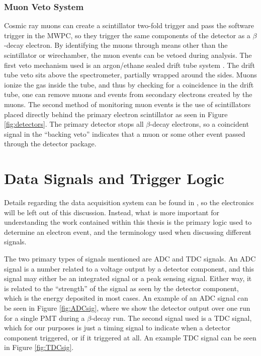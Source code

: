 \subsubsection{Muon Veto System}

Cosmic ray muons can create a scintillator two-fold trigger and pass the software trigger in
the MWPC, so they trigger the same components of the detector as a $\beta$-decay electron. By identifying
the muons through means other than the scintillator or wirechamber, the muon events
can be vetoed during analysis. The first veto mechanism used
is an argon/ethane sealed drift tube system \cite{rios2011sealed}. The drift tube veto sits
above the spectrometer, partially wrapped around the sides. Muons ionize the gas inside the
tube, and thus by checking for a coincidence in the drift tube, one can remove muons
and events from secondary electrons created by the muons. The second method of monitoring
muon events is the use of scintillators placed directly behind the primary
electron scintillator as seen in Figure \ref{fig:detectors}. The primary detector
stops all $\beta$-decay electrons, so a coincident signal in the ``backing veto''
indicates that a muon or some other event passed through the detector package.

\section{Data Signals and Trigger Logic}

Details regarding the data acquisition system can be found in \cite{plaster2012,mpmThesis},
so the electronics will be left out of this discussion. Instead, what is more important for
understanding the work contained within this thesis is the primary logic used to
determine an electron event, and the terminology used when discussing different signals.

The two primary types of signals mentioned are ADC and TDC signals.
An ADC signal is a number related to a voltage output by a detector component, and this
signal may either be an integrated signal or a peak sensing signal. Either way, it is related
to the ``strength'' of the signal as seen by the detector component, which is the energy deposited
in most cases. An example of an ADC signal can be seen in Figure \ref{fig:ADCsig}, where we show the
detector output over one run for a single PMT during a $\beta$-decay run.
The second signal used is a TDC signal, which for our purposes is
just a timing signal to indicate when a detector component triggered, or if it triggered at all.
An example TDC signal can be
seen in Figure \ref{fig:TDCsig}.

